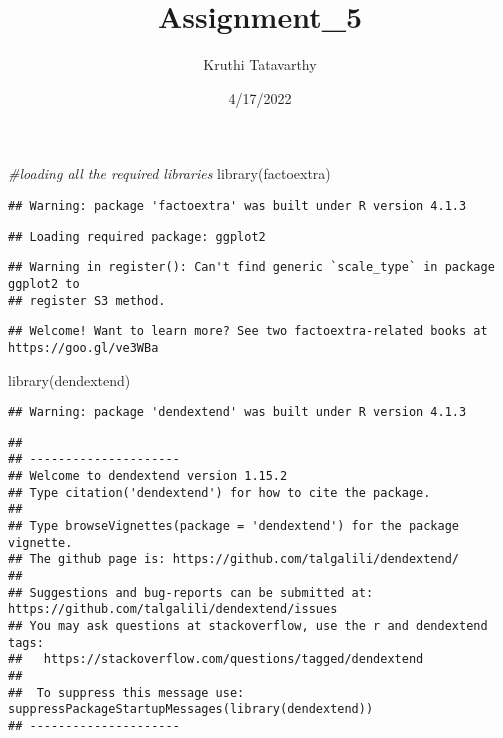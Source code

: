 \documentclass[
]{article}
\title{Assignment\_5}
\author{Kruthi Tatavarthy}
\date{4/17/2022}
\newenvironment{Shaded}{\begin{snugshade}}{\end{snugshade}}
\newcommand{\CommentTok}[1]{\textcolor[rgb]{0.56,0.35,0.01}{\textit{#1}}}
\newcommand{\FunctionTok}[1]{\textcolor[rgb]{0.00,0.00,0.00}{#1}}
\newcommand{\NormalTok}[1]{#1}
\begin{document}
\maketitle

\begin{Shaded}
\begin{Highlighting}[]
\CommentTok{\#loading all the required libraries}
\FunctionTok{library}\NormalTok{(factoextra)}
\end{Highlighting}
\end{Shaded}

\begin{verbatim}
## Warning: package 'factoextra' was built under R version 4.1.3
\end{verbatim}

\begin{verbatim}
## Loading required package: ggplot2
\end{verbatim}

\begin{verbatim}
## Warning in register(): Can't find generic `scale_type` in package ggplot2 to
## register S3 method.
\end{verbatim}

\begin{verbatim}
## Welcome! Want to learn more? See two factoextra-related books at https://goo.gl/ve3WBa
\end{verbatim}

\begin{Shaded}
\begin{Highlighting}[]
\FunctionTok{library}\NormalTok{(dendextend)}
\end{Highlighting}
\end{Shaded}

\begin{verbatim}
## Warning: package 'dendextend' was built under R version 4.1.3
\end{verbatim}

\begin{verbatim}
## 
## ---------------------
## Welcome to dendextend version 1.15.2
## Type citation('dendextend') for how to cite the package.
## 
## Type browseVignettes(package = 'dendextend') for the package vignette.
## The github page is: https://github.com/talgalili/dendextend/
## 
## Suggestions and bug-reports can be submitted at: https://github.com/talgalili/dendextend/issues
## You may ask questions at stackoverflow, use the r and dendextend tags: 
##   https://stackoverflow.com/questions/tagged/dendextend
## 
##  To suppress this message use:  suppressPackageStartupMessages(library(dendextend))
## ---------------------
\end{verbatim}
\end{document}
